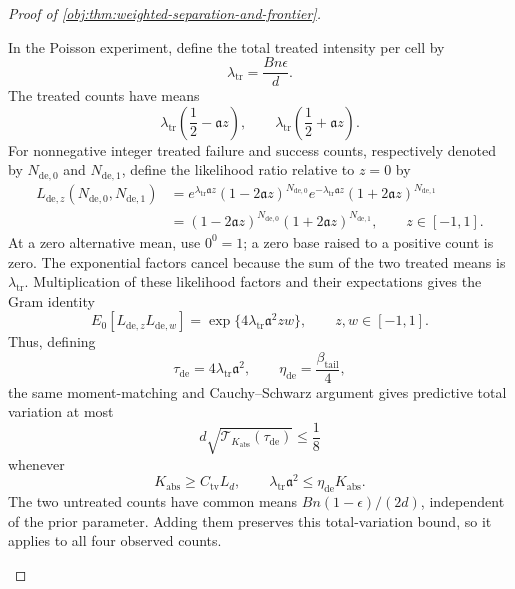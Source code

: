 \begin{proof}[Proof of \cref{obj:thm:weighted-separation-and-frontier}]
\begin{enumerate}
In the Poisson experiment, define the total treated intensity per cell by
\[
\lambda_{\mathrm{tr}}=\frac{Bn\epsilon}{d}.
\]
The treated counts have means
\[
\lambda_{\mathrm{tr}}\left(\frac12-\mathfrak a z\right),
\qquad
\lambda_{\mathrm{tr}}\left(\frac12+\mathfrak a z\right).
\]
For nonnegative integer treated failure and success counts, respectively denoted by \(N_{\mathrm{de},0}\) and \(N_{\mathrm{de},1}\), define the likelihood ratio relative to \(z=0\) by
\[
\begin{aligned}
L_{\mathrm{de},z}(N_{\mathrm{de},0},N_{\mathrm{de},1})
&=e^{\lambda_{\mathrm{tr}}\mathfrak a z}
 (1-2\mathfrak a z)^{N_{\mathrm{de},0}}
 e^{-\lambda_{\mathrm{tr}}\mathfrak a z}
 (1+2\mathfrak a z)^{N_{\mathrm{de},1}}\\
&=(1-2\mathfrak a z)^{N_{\mathrm{de},0}}
  (1+2\mathfrak a z)^{N_{\mathrm{de},1}},
\qquad z\in[-1,1].
\end{aligned}
\]
At a zero alternative mean, use \(0^0=1\); a zero base raised to a positive count is zero. The exponential factors cancel because the sum of the two treated means is \(\lambda_{\mathrm{tr}}\). Multiplication of these likelihood factors and their expectations gives the Gram identity
\[
E_0[L_{\mathrm{de},z}L_{\mathrm{de},w}]
=\exp\{4\lambda_{\mathrm{tr}}\mathfrak a^2zw\},
\qquad z,w\in[-1,1].
\]
Thus, defining
\[
\tau_{\mathrm{de}}=4\lambda_{\mathrm{tr}}\mathfrak a^2,
\qquad
\eta_{\mathrm{de}}=\frac{\beta_{\mathrm{tail}}}{4},
\]
the same moment-matching and Cauchy--Schwarz argument gives predictive total variation at most
\[
d\sqrt{\mathcal T_{K_{\mathrm{abs}}}(\tau_{\mathrm{de}})}
\le\frac18
\]
whenever
\[
K_{\mathrm{abs}}\ge C_{\mathrm{tv}}L_d,
\qquad
\lambda_{\mathrm{tr}}\mathfrak a^2
\le\eta_{\mathrm{de}}K_{\mathrm{abs}}.
\]
The two untreated counts have common means
\(Bn(1-\epsilon)/(2d)\), independent of the prior parameter. Adding them preserves this total-variation bound, so it applies to all four observed counts.


\end{enumerate}
\end{proof}
